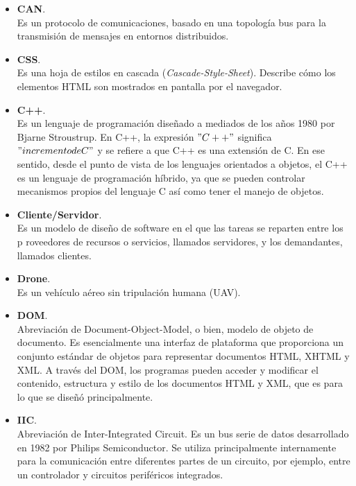 \begin{itemize}
	\item \textbf{CAN}. \\
Es un protocolo de comunicaciones, basado en una topología bus para la 
transmisión de mensajes en entornos distribuidos.

	\item \textbf{CSS}. \\
Es una hoja de estilos en cascada (\emph{Cascade-Style-Sheet}). Describe cómo 
los elementos HTML son mostrados en pantalla por el navegador.

	\item \textbf{C++}. \\
Es un lenguaje de programación diseñado a mediados de los años 1980 por Bjarne 
Stroustrup. En C++, la expresión $"C++"$ significa $"incremento de C"$ y se 
refiere a que C++ es una extensión de C. En ese sentido, desde el punto de vista 
de los lenguajes orientados a objetos, el C++ es un lenguaje de programación 
híbrido, ya que se pueden controlar mecanismos propios del lenguaje C así como 
tener el manejo de objetos.

	\item \textbf{Cliente/Servidor}. \\
Es un modelo de diseño de software en el que las tareas se reparten entre los p
roveedores de recursos o servicios, llamados servidores, y los demandantes, 
llamados clientes.

	\item \textbf{Drone}. \\
Es un vehículo aéreo sin tripulación humana (UAV).

	\item \textbf{DOM}. \\
Abreviación de Document-Object-Model, o bien, modelo de objeto de documento. 
Es esencialmente una interfaz de plataforma que proporciona un conjunto estándar 
de objetos para representar documentos HTML, XHTML y XML. A través del DOM, los 
programas pueden acceder y modificar el contenido, estructura y estilo de los 
documentos HTML y XML, que es para lo que se diseñó principalmente.

	\item \textbf{IIC}. \\
Abreviación de Inter-Integrated Circuit. Es un bus serie de datos desarrollado 
en 1982 por Philips Semiconductor.  Se utiliza principalmente internamente para 
la comunicación entre diferentes partes de un circuito, por ejemplo, entre un 
controlador y circuitos periféricos integrados.


\end{itemize}
